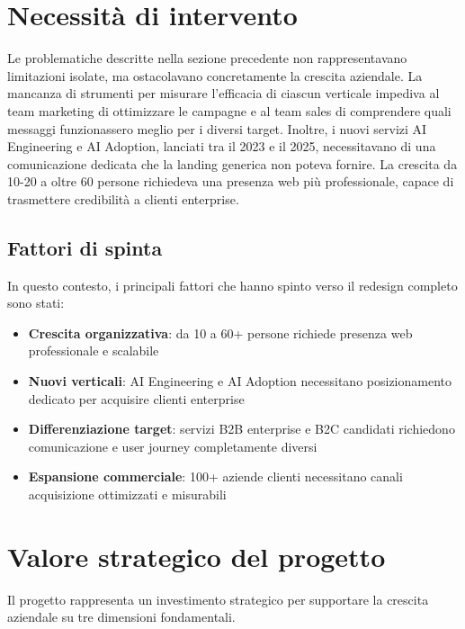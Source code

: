 \section{Necessità di intervento}
Le problematiche descritte nella sezione precedente non rappresentavano 
limitazioni isolate, ma ostacolavano concretamente la crescita aziendale. 
La mancanza di strumenti per misurare l'efficacia di ciascun verticale 
impediva al team marketing di ottimizzare le campagne e al team sales 
di comprendere quali messaggi funzionassero meglio per i diversi target. 
Inoltre, i nuovi servizi AI Engineering e AI Adoption, lanciati tra il 
2023 e il 2025, necessitavano di una comunicazione dedicata che la 
landing generica non poteva fornire. La crescita da 10-20 a oltre 60 
persone richiedeva una presenza web più professionale, capace di 
trasmettere credibilità a clienti enterprise.

\subsection{Fattori di spinta}
In questo contesto, i principali fattori che hanno spinto verso il 
redesign completo sono stati:

\begin{itemize}
  \item \textbf{Crescita organizzativa}: da 10 a 60+ persone 
        richiede presenza web professionale e scalabile
  
  \item \textbf{Nuovi verticali}: AI Engineering e AI Adoption 
        necessitano posizionamento dedicato per acquisire clienti 
        enterprise
  
  \item \textbf{Differenziazione target}: servizi B2B enterprise e 
        B2C candidati richiedono comunicazione e user journey 
        completamente diversi
  
  \item \textbf{Espansione commerciale}: 100+ aziende clienti 
    necessitano canali acquisizione ottimizzati e misurabili
\end{itemize}

\section{Valore strategico del progetto}
Il progetto rappresenta un investimento strategico per supportare la 
crescita aziendale su tre dimensioni fondamentali.

